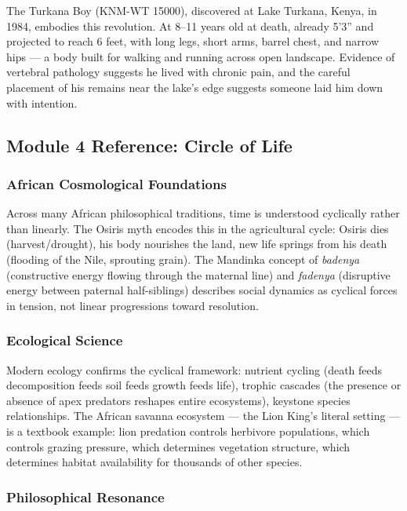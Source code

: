 \documentclass[11pt,letterpaper]{article}
\begin{document}
The Turkana Boy (KNM-WT 15000), discovered at Lake Turkana, Kenya, in 1984, embodies this revolution. At 8--11 years old at death, already 5'3'' and projected to reach 6 feet, with long legs, short arms, barrel chest, and narrow hips --- a body built for walking and running across open landscape. Evidence of vertebral pathology suggests he lived with chronic pain, and the careful placement of his remains near the lake's edge suggests someone laid him down with intention.

\subsection{Module 4 Reference: Circle of Life}

\subsubsection{African Cosmological Foundations}

Across many African philosophical traditions, time is understood cyclically rather than linearly. The Osiris myth encodes this in the agricultural cycle: Osiris dies (harvest/drought), his body nourishes the land, new life springs from his death (flooding of the Nile, sprouting grain). The Mandinka concept of \textit{badenya} (constructive energy flowing through the maternal line) and \textit{fadenya} (disruptive energy between paternal half-siblings) describes social dynamics as cyclical forces in tension, not linear progressions toward resolution.

\subsubsection{Ecological Science}

Modern ecology confirms the cyclical framework: nutrient cycling (death feeds decomposition feeds soil feeds growth feeds life), trophic cascades (the presence or absence of apex predators reshapes entire ecosystems), keystone species relationships. The African savanna ecosystem --- the Lion King's literal setting --- is a textbook example: lion predation controls herbivore populations, which controls grazing pressure, which determines vegetation structure, which determines habitat availability for thousands of other species.

\subsubsection{Philosophical Resonance}
\end{document}
